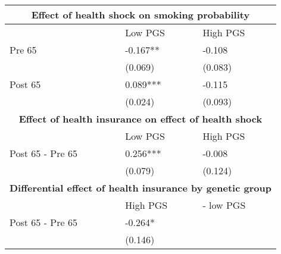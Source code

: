 % 
\begin{tabular}{lll}
  \toprule
  \multicolumn{3}{c}{ \textbf{Effect of health shock on smoking probability}} \\
 \midrule
 & Low PGS & High PGS \\ 
   \midrule
Pre 65 & -0.167** & -0.108 \\ 
   & (0.069) & (0.083) \\ 
  Post 65 & 0.089*** & -0.115 \\ 
   & (0.024) & (0.093) \\ 
   \toprule \multicolumn{3}{c}{ \textbf{Effect of health insurance on effect of health shock}} \\
 \midrule
 & Low PGS & High PGS \\ 
   \midrule
Post 65 - Pre 65 & 0.256*** & -0.008 \\ 
   & (0.079) & (0.124) \\ 
   \toprule \multicolumn{3}{c}{ \textbf{Differential effect of health insurance by genetic group}} \\
 \midrule
 & High PGS  & - low PGS \\ 
   \midrule
Post 65 - Pre 65 & -0.264* &  \\ 
   & (0.146) &  \\ 
   \bottomrule
\end{tabular}
